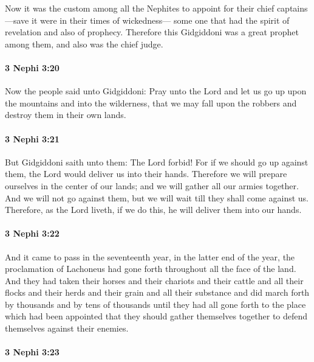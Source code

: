 			Now it was the custom among all the Nephites
			to appoint for their chief captains---save it were in their times of wickedness---
			some one that had the spirit of revelation and also of prophecy.
			Therefore this Gidgiddoni was a great prophet among them,
			and also was the chief judge.

		\paragraph{3 Nephi 3:20} %
			\label{3NEPHI-3-20}

			Now the people said unto Gidgiddoni:
			Pray unto the Lord and let us go up upon the mountains and into the wilderness,
			that we may fall upon the robbers and destroy them in their own lands.

		\paragraph{3 Nephi 3:21} %
			\label{3NEPHI-3-21}

			But Gidgiddoni saith unto them:
			The Lord forbid!
			For if we should go up against them,
			the Lord would deliver us into their hands.
			Therefore we will prepare ourselves in the center of our lands;
			and we will gather all our armies together.
			And we will not go against them,
			but we will wait till they shall come against us.
			Therefore, as the Lord liveth,
			if we do this, he will deliver them into our hands.

		\paragraph{3 Nephi 3:22} %
			\label{3NEPHI-3-22}

			And it came to pass in the seventeenth year, in the latter end of the year,
			the proclamation of Lachoneus had gone forth throughout all the face of the land.
			And they had taken their horses and their chariots
			and their cattle and all their flocks and their herds
			and their grain and all their substance
			and did march forth by thousands and by tens of thousands
			until they had all gone forth to the place which had been appointed
			that they should gather themselves together
			to defend themselves against their enemies.

		\paragraph{3 Nephi 3:23} %
			\label{3NEPHI-3-23}

